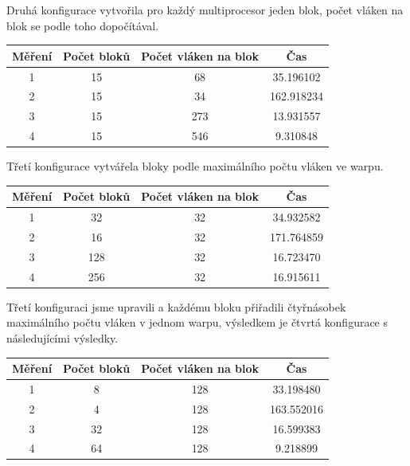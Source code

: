 \documentclass[12pt]{article}
\begin{document}
Druhá konfigurace vytvořila pro každý multiprocesor jeden blok, počet vláken na blok se podle toho dopočítával.
\begin{center}
\begin{tabular}{c | c | c | c}
\textbf{Měření} & \textbf{Počet bloků} & \textbf{Počet vláken na blok} & \textbf{Čas} \\ \hline \hline
1 & 15 & 68 & 35.196102 \\ \hline
2 & 15 & 34 & 162.918234 \\ \hline
3 & 15 & 273 & 13.931557 \\ \hline
4 & 15 & 546 & 9.310848 \\ \hline
\end{tabular}
\end{center}

Třetí konfigurace vytvářela bloky podle maximálního počtu vláken ve warpu.
\begin{center}
\begin{tabular}{c | c | c | c}
\textbf{Měření} & \textbf{Počet bloků} & \textbf{Počet vláken na blok} & \textbf{Čas} \\ \hline \hline
1 & 32 & 32 & 34.932582 \\ \hline
2 & 16 & 32 & 171.764859 \\ \hline
3 & 128 & 32 & 16.723470 \\ \hline
4 & 256 & 32 & 16.915611 \\ \hline
\end{tabular}
\end{center}

Třetí konfiguraci jsme upravili a každému bloku přiřadili čtyřnásobek maximálního počtu vláken v jednom warpu,
výsledkem je čtvrtá konfigurace s následujícími výsledky.
\begin{center}
\begin{tabular}{c | c | c | c}
\textbf{Měření} & \textbf{Počet bloků} & \textbf{Počet vláken na blok} & \textbf{Čas} \\ \hline \hline
1 & 8 & 128 & 33.198480 \\ \hline
2 & 4 & 128 & 163.552016 \\ \hline
3 & 32 & 128 & 16.599383 \\ \hline
4 & 64 & 128 & 9.218899 \\ \hline
\end{tabular}
\end{center}
\end{document}
